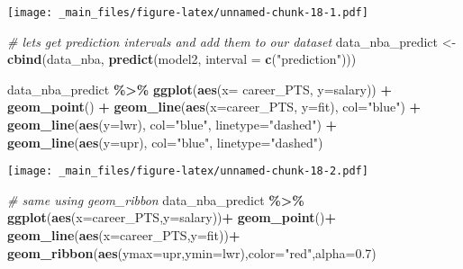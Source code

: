 \documentclass[
]{book}
\newenvironment{Shaded}{\begin{snugshade}}{\end{snugshade}}
\newcommand{\AttributeTok}[1]{\textcolor[rgb]{0.13,0.29,0.53}{#1}}
\newcommand{\CommentTok}[1]{\textcolor[rgb]{0.56,0.35,0.01}{\textit{#1}}}
\newcommand{\FloatTok}[1]{\textcolor[rgb]{0.00,0.00,0.81}{#1}}
\newcommand{\FunctionTok}[1]{\textcolor[rgb]{0.13,0.29,0.53}{\textbf{#1}}}
\newcommand{\NormalTok}[1]{#1}
\newcommand{\OtherTok}[1]{\textcolor[rgb]{0.56,0.35,0.01}{#1}}
\newcommand{\SpecialCharTok}[1]{\textcolor[rgb]{0.81,0.36,0.00}{\textbf{#1}}}
\newcommand{\StringTok}[1]{\textcolor[rgb]{0.31,0.60,0.02}{#1}}
\begin{document}
\texttt{[image: \_main\_files/figure-latex/unnamed-chunk-18-1.pdf]}

\begin{Shaded}
\begin{Highlighting}[]
\CommentTok{\# let\textquotesingle{}s get prediction intervals and add them to our dataset}
\NormalTok{data\_nba\_predict }\OtherTok{\textless{}{-}} \FunctionTok{cbind}\NormalTok{(data\_nba, }\FunctionTok{predict}\NormalTok{(model2, }\AttributeTok{interval =} \FunctionTok{c}\NormalTok{(}\StringTok{"prediction"}\NormalTok{)))}

\NormalTok{data\_nba\_predict }\SpecialCharTok{\%\textgreater{}\%}
  \FunctionTok{ggplot}\NormalTok{(}\FunctionTok{aes}\NormalTok{(}\AttributeTok{x=}\NormalTok{ career\_PTS, }\AttributeTok{y=}\NormalTok{salary)) }\SpecialCharTok{+}
  \FunctionTok{geom\_point}\NormalTok{() }\SpecialCharTok{+}
  \FunctionTok{geom\_line}\NormalTok{(}\FunctionTok{aes}\NormalTok{(}\AttributeTok{x=}\NormalTok{career\_PTS, }\AttributeTok{y=}\NormalTok{fit),}
            \AttributeTok{col=}\StringTok{"blue"}\NormalTok{) }\SpecialCharTok{+}
  \FunctionTok{geom\_line}\NormalTok{(}\FunctionTok{aes}\NormalTok{(}\AttributeTok{y=}\NormalTok{lwr),}
                \AttributeTok{col=}\StringTok{"blue"}\NormalTok{,}
                \AttributeTok{linetype=}\StringTok{"dashed"}\NormalTok{) }\SpecialCharTok{+}
  \FunctionTok{geom\_line}\NormalTok{(}\FunctionTok{aes}\NormalTok{(}\AttributeTok{y=}\NormalTok{upr),}
                \AttributeTok{col=}\StringTok{"blue"}\NormalTok{,}
                \AttributeTok{linetype=}\StringTok{"dashed"}\NormalTok{)}
\end{Highlighting}
\end{Shaded}

\texttt{[image: \_main\_files/figure-latex/unnamed-chunk-18-2.pdf]}

\begin{Shaded}
\begin{Highlighting}[]
\CommentTok{\# same using geom\_ribbon}
\NormalTok{data\_nba\_predict }\SpecialCharTok{\%\textgreater{}\%}
\FunctionTok{ggplot}\NormalTok{(}\FunctionTok{aes}\NormalTok{(}\AttributeTok{x=}\NormalTok{career\_PTS,}\AttributeTok{y=}\NormalTok{salary))}\SpecialCharTok{+}
  \FunctionTok{geom\_point}\NormalTok{()}\SpecialCharTok{+}
  \FunctionTok{geom\_line}\NormalTok{(}\FunctionTok{aes}\NormalTok{(}\AttributeTok{x=}\NormalTok{career\_PTS,}\AttributeTok{y=}\NormalTok{fit))}\SpecialCharTok{+}
  \FunctionTok{geom\_ribbon}\NormalTok{(}\FunctionTok{aes}\NormalTok{(}\AttributeTok{ymax=}\NormalTok{upr,}\AttributeTok{ymin=}\NormalTok{lwr),}\AttributeTok{color=}\StringTok{"red"}\NormalTok{,}\AttributeTok{alpha=}\FloatTok{0.7}\NormalTok{)}
\end{Highlighting}
\end{Shaded}
\end{document}
